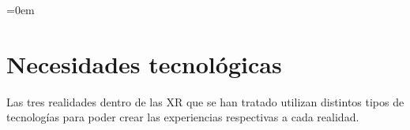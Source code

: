 \parindent=0em
\section{Necesidades tecnológicas}
\label{sec:necesidadesTecnologicas}
\noindent

Las tres realidades dentro de las XR que se han tratado utilizan distintos tipos de tecnologías para poder crear las experiencias respectivas a cada realidad. \\













